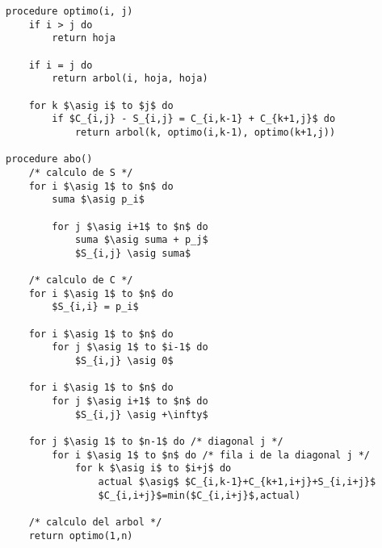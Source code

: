 \documentclass{article}
\newcommand{\asig}{\ensuremath{\leftarrow}}
\begin{document}
\begin{lstlisting}[float,caption={Solución del problema 8.34},label=alg:completo]
procedure optimo(i, j)
    if i > j do
        return hoja

    if i = j do
        return arbol(i, hoja, hoja)

    for k $\asig i$ to $j$ do
        if $C_{i,j} - S_{i,j} = C_{i,k-1} + C_{k+1,j}$ do
            return arbol(k, optimo(i,k-1), optimo(k+1,j))

procedure abo()
    /* calculo de S */
    for i $\asig 1$ to $n$ do
        suma $\asig p_i$

        for j $\asig i+1$ to $n$ do
            suma $\asig suma + p_j$
            $S_{i,j} \asig suma$

    /* calculo de C */
    for i $\asig 1$ to $n$ do
        $S_{i,i} = p_i$

    for i $\asig 1$ to $n$ do
        for j $\asig 1$ to $i-1$ do
            $S_{i,j} \asig 0$

    for i $\asig 1$ to $n$ do
        for j $\asig i+1$ to $n$ do
            $S_{i,j} \asig +\infty$

    for j $\asig 1$ to $n-1$ do /* diagonal j */
        for i $\asig 1$ to $n$ do /* fila i de la diagonal j */
            for k $\asig i$ to $i+j$ do
                actual $\asig$ $C_{i,k-1}+C_{k+1,i+j}+S_{i,i+j}$
                $C_{i,i+j}$=min($C_{i,i+j}$,actual)

    /* calculo del arbol */
    return optimo(1,n)
\end{lstlisting}
\end{document}
